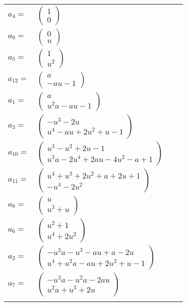\documentclass[1p]{elsarticle_modified}
\theoremstyle{definition}
\begin{document}
\begin{tabular}{m{7pt} m{180pt} m{7pt} m{180pt} }
\flushright $a_{4}=$&$\begin{pmatrix}1\\0\end{pmatrix}$ \\
\flushright $a_{9}=$&$\begin{pmatrix}0\\u\end{pmatrix}$ \\
\flushright $a_{5}=$&$\begin{pmatrix}1\\u^2\end{pmatrix}$ \\
\flushright $a_{12}=$&$\begin{pmatrix}a\\- a u-1\end{pmatrix}$ \\
\flushright $a_{1}=$&$\begin{pmatrix}a\\u^2 a- a u-1\end{pmatrix}$ \\
\flushright $a_{3}=$&$\begin{pmatrix}- u^3-2 u\\u^4- a u+2 u^2+u-1\end{pmatrix}$ \\
\flushright $a_{10}=$&$\begin{pmatrix}u^3- u^2+2 u-1\\u^3 a-2 u^4+2 a u-4 u^2- a+1\end{pmatrix}$ \\
\flushright $a_{11}=$&$\begin{pmatrix}u^4+u^3+2 u^2+a+2 u+1\\- u^4-2 u^2\end{pmatrix}$ \\
\flushright $a_{8}=$&$\begin{pmatrix}u\\u^3+u\end{pmatrix}$ \\
\flushright $a_{6}=$&$\begin{pmatrix}u^2+1\\u^4+2 u^2\end{pmatrix}$ \\
\flushright $a_{2}=$&$\begin{pmatrix}- u^3 a- u^3- a u+a-2 u\\u^4+u^2 a- a u+2 u^2+u-1\end{pmatrix}$ \\
\flushright $a_{7}=$&$\begin{pmatrix}- u^3 a- u^2 a-2 a u\\u^2 a+u^3+2 u\end{pmatrix}$\\&\end{tabular}
\end{document}
